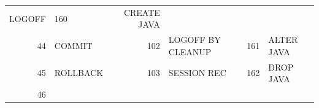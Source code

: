 \begin{appendix}
\begin{longtable}[]{@{}rl|rl|rl@{}}
\begin{minipage}[t]{0.24\columnwidth}
LOGOFF\strut
\end{minipage} & \begin{minipage}[t]{0.06\columnwidth}\raggedright\strut
160\strut
\end{minipage} & \begin{minipage}[t]{0.24\columnwidth}\raggedright\strut
CREATE JAVA\strut
\end{minipage}\tabularnewline
\begin{minipage}[t]{0.06\columnwidth}\raggedright\strut
44\strut
\end{minipage} & \begin{minipage}[t]{0.19\columnwidth}\raggedright\strut
COMMIT\strut
\end{minipage} & \begin{minipage}[t]{0.06\columnwidth}\raggedright\strut
102\strut
\end{minipage} & \begin{minipage}[t]{0.24\columnwidth}\raggedright\strut
LOGOFF BY CLEANUP\strut
\end{minipage} & \begin{minipage}[t]{0.06\columnwidth}\raggedright\strut
161\strut
\end{minipage} & \begin{minipage}[t]{0.24\columnwidth}\raggedright\strut
ALTER JAVA\strut
\end{minipage}\tabularnewline
\begin{minipage}[t]{0.06\columnwidth}\raggedright\strut
45\strut
\end{minipage} & \begin{minipage}[t]{0.19\columnwidth}\raggedright\strut
ROLLBACK\strut
\end{minipage} & \begin{minipage}[t]{0.06\columnwidth}\raggedright\strut
103\strut
\end{minipage} & \begin{minipage}[t]{0.24\columnwidth}\raggedright\strut
SESSION REC\strut
\end{minipage} & \begin{minipage}[t]{0.06\columnwidth}\raggedright\strut
162\strut
\end{minipage} & \begin{minipage}[t]{0.24\columnwidth}\raggedright\strut
DROP JAVA\strut
\end{minipage}\tabularnewline
\begin{minipage}[t]{0.06\columnwidth}\raggedright\strut
46\strut
\end{minipage} & \begin{minipage}[t]{0.19\columnwidth}\raggedright\strut

\end{minipage}
\end{longtable}
\end{appendix}
